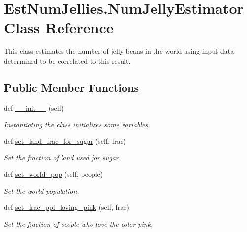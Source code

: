 \hypertarget{class_est_num_jellies_1_1_num_jelly_estimator}{}\section{Est\+Num\+Jellies.\+Num\+Jelly\+Estimator Class Reference}
\label{class_est_num_jellies_1_1_num_jelly_estimator}


This class estimates the number of jelly beans in the world using input data determined to be correlated to this result.  


\subsection*{Public Member Functions}
\begin{DoxyCompactItemize}
\item 
def \hyperlink{class_est_num_jellies_1_1_num_jelly_estimator_ab5d187b2dfbd0a52034edc88a6cd9171}{\+\_\+\+\_\+init\+\_\+\+\_\+} (self)
\begin{DoxyCompactList}\small\item\em Instantiating the class initializes some variables. \end{DoxyCompactList}\item 
def \hyperlink{class_est_num_jellies_1_1_num_jelly_estimator_a2f42a6d687f98d5128983ff43d6b4989}{set\+\_\+land\+\_\+frac\+\_\+for\+\_\+sugar} (self, frac)
\begin{DoxyCompactList}\small\item\em Set the fraction of land used for sugar. \end{DoxyCompactList}\item 
def \hyperlink{class_est_num_jellies_1_1_num_jelly_estimator_a0244b2d3252a7b1d7106fae186121d75}{set\+\_\+world\+\_\+pop} (self, people)
\begin{DoxyCompactList}\small\item\em Set the world population. \end{DoxyCompactList}\item 
def \hyperlink{class_est_num_jellies_1_1_num_jelly_estimator_a3af6f81c95c3b551174d39509615cb0e}{set\+\_\+frac\+\_\+ppl\+\_\+loving\+\_\+pink} (self, frac)
\begin{DoxyCompactList}\small\item\em Set the fraction of people who love the color pink. \end{DoxyCompactList}\item 

\end{DoxyCompactItemize}
